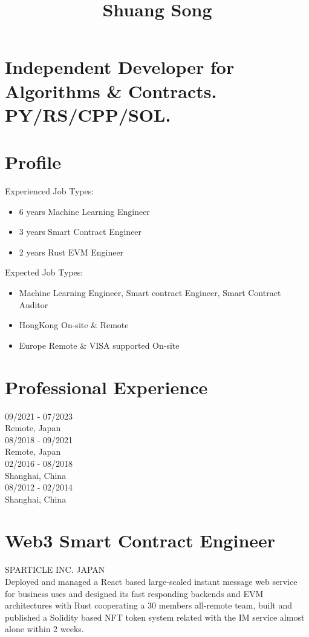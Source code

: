 \documentclass[10pt]{article}
\title{Shuang Song }
\author{}
\date{}
\begin{document}
\maketitle
\section*{Independent Developer for Algorithms \& Contracts. PY/RS/CPP/SOL.}
\section*{Profile}
Experienced Job Types:

\begin{itemize}
  \item 6 years Machine Learning Engineer
  \item 3 years Smart Contract Engineer
  \item 2 years Rust EVM Engineer
\end{itemize}

Expected Job Types:

\begin{itemize}
  \item Machine Learning Engineer, Smart contract Engineer, Smart Contract Auditor
  \item HongKong On-site \& Remote
  \item Europe Remote \& VISA supported On-site
\end{itemize}

\section*{Professional Experience}
09/2021 - 07/2023\\
Remote, Japan\\
08/2018 - 09/2021\\
Remote, Japan\\
02/2016 - 08/2018\\
Shanghai, China\\
08/2012 - 02/2014\\
Shanghai, China

\section*{Web3 Smart Contract Engineer}
SPARTICLE INC. JAPAN\\
Deployed and managed a React based large-scaled instant message web service for business uses and designed its fast responding backends and EVM architectures with Rust cooperating a 30 members all-remote team, built and published a Solidity based NFT token system related with the IM service almost alone within 2 weeks.
\end{document}
